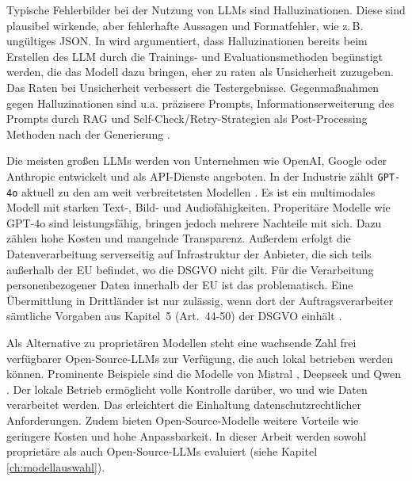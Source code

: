 Typische Fehlerbilder bei der Nutzung von \acp{LLM} sind Halluzinationen. Diese sind plausibel wirkende, aber fehlerhafte Aussagen und Formatfehler, wie z.\,B. ungültiges JSON. In \cite{kalai2025languagemodelshallucinate} wird argumentiert, dass Halluzinationen bereits beim Erstellen des \ac{LLM} durch die Trainings- und Evaluationsmethoden begünstigt werden, die das Modell dazu bringen, eher zu raten als Unsicherheit zuzugeben. Das Raten bei Unsicherheit verbessert die Testergebnisse. Gegenmaßnahmen gegen Halluzinationen sind u.a. präzisere Prompts, Informationserweiterung des Prompts durch \ac{RAG} und Self-Check/Retry-Strategien als Post-Processing Methoden nach der Generierung \cite{ji2023hallucinationsurvey}.

Die meisten großen \acp{LLM} werden von Unternehmen wie OpenAI, Google oder Anthropic entwickelt und als API-Dienste angeboten. In der Industrie zählt \texttt{GPT-4o} aktuell zu den am weit verbreitetsten Modellen \cite{openai-hello-gpt-4o}. Es ist ein multimodales Modell mit starken Text-, Bild- und Audiofähigkeiten. Properitäre Modelle wie GPT-4o sind leistungsfähig, bringen jedoch mehrere Nachteile mit sich. Dazu zählen hohe Kosten und mangelnde Transparenz. Außerdem erfolgt die Datenverarbeitung serverseitig auf Infrastruktur der Anbieter, die sich teils außerhalb der \ac{EU} befindet, wo die \ac{DSGVO} nicht gilt. Für die Verarbeitung personenbezogener Daten innerhalb der \ac{EU} ist das problematisch. Eine Übermittlung in Drittländer ist nur zulässig, wenn dort der Auftragsverarbeiter sämtliche Vorgaben aus Kapitel~5 (Art.~44-50) der \ac{DSGVO} einhält \cite{GDPR2016}.

Als Alternative zu proprietären Modellen steht eine wachsende Zahl frei verfügbarer Open-Source-\acp{LLM} zur Verfügung, die auch lokal betrieben werden können. Prominente Beispiele sind die Modelle von Mistral \cite{mistralai}, Deepseek \cite{deepseek} und Qwen \cite{qwen}. Der lokale Betrieb ermöglicht volle Kontrolle darüber, wo und wie Daten verarbeitet werden. Das erleichtert die Einhaltung datenschutzrechtlicher Anforderungen. Zudem bieten Open-Source-Modelle weitere Vorteile wie geringere Kosten und hohe Anpassbarkeit. In dieser Arbeit werden sowohl proprietäre als auch Open-Source-\acp{LLM} evaluiert (siehe Kapitel \ref{ch:modellauswahl}).